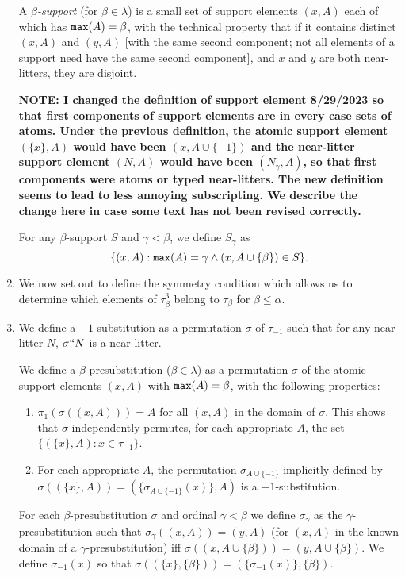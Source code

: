 \documentclass[12pt]{article}
\begin{document}
\begin{enumerate}
A {\em $\beta$-support\/} (for $\beta \in \lambda$) is a small set of support elements $(x,A)$ each of which has ${\tt max}(A)=\beta$, with the technical property that if it contains distinct $(x,A)$ and $(y,A)$ [with the same second component;  not all elements of a support need have the same second component], and $x$ and $y$ are both near-litters, they are disjoint.

{\bf NOTE:  I changed the definition of support element 8/29/2023 so that first components of support elements are in every case sets of atoms.
Under the previous definition, the atomic support element $(\{x\},A)$ would have been $(x,A\cup \{-1\})$ and the near-litter support element $(N,A)$ would have been $(N_\gamma,A)$, so
that first components were atoms or typed near-litters.  The new definition seems to lead to less annoying subscripting.  We describe the change here in case some text has not been revised correctly.}

For any $\beta$-support $S$ and $\gamma<\beta$, we define $S_\gamma$ as $$\{(x,A):{\tt max}(A)=\gamma \wedge (x,A\cup \{\beta\}) \in S\}.$$

\item  We now set out to define the symmetry condition which allows us to determine which elements of $\tau^3_\beta$ belong to $\tau_\beta$ for $\beta\leq \alpha$.

\item We define a $-1$-substitution as a permutation $\sigma$ of $\tau_{-1}$ such that for any near-litter $N$, $\sigma``N$ is a near-litter.

We define a $\beta$-presubstitution ($\beta\in \lambda$) as a permutation $\sigma$ of the atomic support elements $(x,A)$ with ${\tt max}(A)=\beta$, with the following properties:

\begin {enumerate}

\item $\pi_1(\sigma((x,A))) = A$ for all $(x,A)$ in the domain of $\sigma$.  This shows that $\sigma$ independently permutes, for each appropriate $A$, the set $\{(\{x\},A):x \in \tau_{-1}\}$.

\item For each appropriate $A$, the permutation $\sigma_{A\cup \{-1\}}$ implicitly defined by $\sigma((\{x\},A)) = (\{\sigma_{A\cup \{-1\}}(x)\},A)$ is a $-1$-substitution.

\end{enumerate}

For each $\beta$-presubstitution $\sigma$ and ordinal $\gamma<\beta$ we define $\sigma_\gamma$ as the $\gamma$-presubstitution such that $\sigma_\gamma((x,A)) = (y,A)$ (for $(x,A)$ in the known domain of a $\gamma$-presubstitution) iff $\sigma((x,A \cup \{\beta\})) = (y,A \cup \{\beta\})$.
We define $\sigma_{-1}(x)$ so that $\sigma((\{x\},\{\beta\})) = (\{\sigma_{-1}(x)\},\{\beta\})$.


\end{enumerate}
\end{document}
